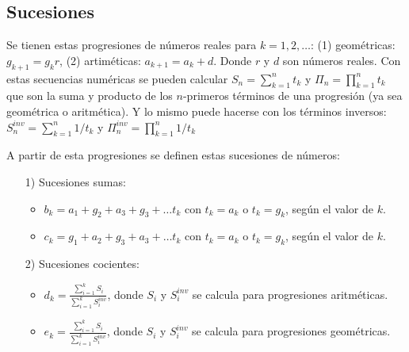 




\separacion
\subsection{Sucesiones}

Se tienen estas  progresiones de números reales para $k=1,2,\ldots$: (1) geométricas: $g_{k+1}=g_{k}r$, (2) artiméticas: $a_{k+1}=a_{k}+d$. Donde $r$ y $d$ son números reales. Con estas secuencias numéricas se pueden calcular $S_n=\displaystyle\sum_{k=1}^n t_k$ y $\Pi_n= \displaystyle\prod_{k=1}^n t_k$ que son la suma y producto de los $n$-primeros términos de una progresión (ya sea geométrica o aritmética). Y lo mismo puede hacerse con los términos inversos: 
$\displaystyle S_n^{inv}= \displaystyle\sum_{k=1}^n 1/t_k$ y $\displaystyle\Pi_n^{inv}= \displaystyle\prod_{k=1}^n 1/t_k$ 


A partir de esta progresiones se definen estas sucesiones de números:
\begin{itemize}
\item[1)]  Sucesiones sumas:
	\begin{itemize}
	\item $b_k = a_1 + g_2 + a_3 + g_3 + \ldots t_k$ con $t_k=a_k$ o $t_k=g_k$, según el valor de $k$.
	\item  $c_k = g_1 + a_2 + g_3 + a_3 + \ldots t_k$ con $t_k=a_k$ o $t_k=g_k$, según el valor de $k$.
	\end{itemize}
\item[2)] Sucesiones cocientes:
	\begin{itemize}
	\item  $d_k = \displaystyle \frac{\displaystyle\sum_{i=1}^k  S_i }{\displaystyle\sum_{i=1}^k  S_i^{inv}}$, donde $S_i$ y $S_i^{inv}$ se calcula para progresiones aritméticas.
	\item  $e_k = \displaystyle\frac{\displaystyle\sum_{i=1}^k  S_i }{\displaystyle\sum_{i=1}^k  S_i^{inv}}$, donde $S_i$ y $S_i^{inv}$ se calcula para progresiones geométricas.
	\end{itemize}
\end{itemize}


